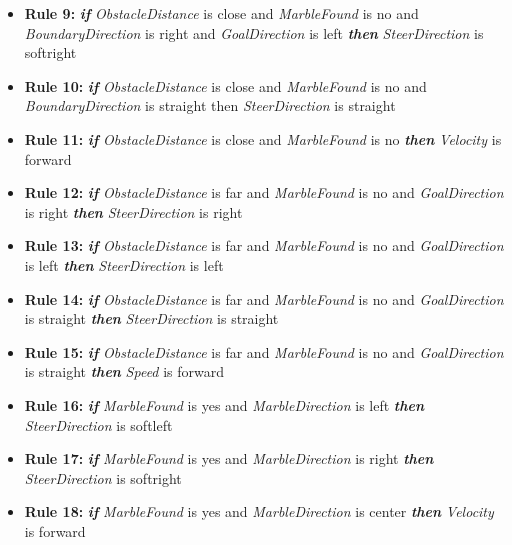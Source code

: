 \documentclass[../Head/Main.tex]{subfiles}
\begin{document}
\begin{itemize}
\item {\large \textbf{Rule 9:}} \textbf{\textit{if}} \textit{ObstacleDistance} is close and \textit{MarbleFound} is no and \textit{BoundaryDirection} is right and \textit{GoalDirection} is left \textbf{\textit{then}} \textit{SteerDirection} is softright
 
\item {\large \textbf{Rule 10:}} \textbf{\textit{if}} \textit{ObstacleDistance} is close and \textit{MarbleFound} is no and \textit{BoundaryDirection} is straight then \textit{SteerDirection} is straight

\item {\large \textbf{Rule 11:}} \textbf{\textit{if}} \textit{ObstacleDistance} is close and \textit{MarbleFound} is no \textbf{\textit{then}} \textit{Velocity} is forward

\item {\large \textbf{Rule 12:}} \textbf{\textit{if}} \textit{ObstacleDistance} is far and \textit{MarbleFound} is no and \textit{GoalDirection} is right \textbf{\textit{then}} \textit{SteerDirection} is right

\item {\large \textbf{Rule 13:}} \textbf{\textit{if}} \textit{ObstacleDistance} is far and \textit{MarbleFound} is no and \textit{GoalDirection} is left \textbf{\textit{then}} \textit{SteerDirection} is left

\item {\large \textbf{Rule 14:}} \textbf{\textit{if}} \textit{ObstacleDistance} is far and \textit{MarbleFound} is no and \textit{GoalDirection} is straight \textbf{\textit{then}} \textit{SteerDirection} is straight
 
\item {\large \textbf{Rule 15:}} \textbf{\textit{if}} \textit{ObstacleDistance} is far and \textit{MarbleFound} is no and \textit{GoalDirection} is straight \textbf{\textit{then}} \textit{Speed} is forward

\item {\large \textbf{Rule 16:}} \textbf{\textit{if}} \textit{MarbleFound} is yes and \textit{MarbleDirection} is left \textbf{\textit{then}} \textit{SteerDirection} is softleft

\item {\large \textbf{Rule 17:}} \textbf{\textit{if}} \textit{MarbleFound} is yes and \textit{MarbleDirection} is right \textbf{\textit{then}} \textit{SteerDirection} is softright
 
\item {\large \textbf{Rule 18:}} \textbf{\textit{if}} \textit{MarbleFound} is yes and \textit{MarbleDirection} is center \textbf{\textit{then}} \textit{Velocity} is forward
\end{itemize}
\end{document}
